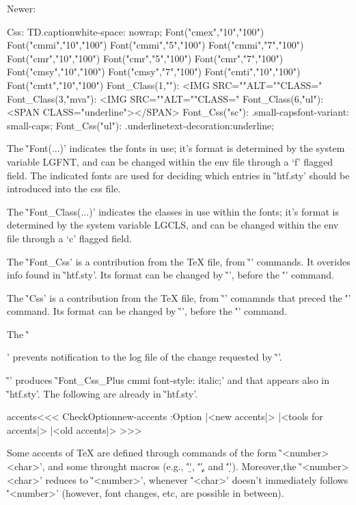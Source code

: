 {{{{{{{{Newer:

\Verbatim
Css: TD.caption{white-space: nowrap; }
Font("cmex","10","100")
Font("cmmi","10","100")
Font("cmmi","5","100")
Font("cmmi","7","100")
Font("cmr","10","100")
Font("cmr","5","100")
Font("cmr","7","100")
Font("cmsy","10","100")
Font("cmsy","7","100")
Font("cmti","10","100")
Font("cmtt","10","100")
Font_Class(1,""): <IMG SRC=""ALT=""CLASS="%
Font_Class(3,"mva"): <IMG SRC=""ALT=""CLASS="%
Font_Class(6,"ul"): <SPAN CLASS="underline"></SPAN>
Font_Css("sc"): .small-caps{font-variant: small-caps; }
Font_Css("ul"): .underline{text-decoration:underline; }
\EndVerbatim

The \`'Font(...)' indicates the fonts in use; it's format is determined
by the system variable LGFNT, and can be changed within the env file
through a `f' flagged field. The indicated fonts are used for deciding
which entries in \`'htf.sty' should be introduced into the css file.

The \`'Font_Class(...)' indicates the classes in use within the fonts;
it's format is determined by the system variable LGCLS, and can be
changed within the env file through a `c' flagged field.

The \`'Font_Css' is a contribution from the TeX file, from
\`''   commands.
It overides info found in \`'htf.sty'.
  Its format can be
changed by \`'', before the
\''\Preamble' command.

The \`'Css' is a contribution from the TeX file, from \`''
comamnds that preced the \''\CssFile' command.  Its format can be changed
by \`'', before the \''\Preamble' command.

The \`'' prevents notification to the
log file of the change requested by \`''.

\`''
produces
\`'Font_Css_Plus cmmi font-style: italic;'
and that appears also in \`'htf.sty'.
The following are already in \`'htf.sty'.



\<accents\><<<
\:CheckOption{new-accents}     \if:Option
   |<new accents|>
\else
   |<tools for accents|>
   |<old accents|> 
\fi
>>>





Some accents of TeX are defined through commands of the form
\`'\accent <number> <char>', and some throught macros (e.g., \''\b',
\''\c', and \''\d').  Moreover,the \`'\accent <number> <char>' reduces
to \`'\char <number>', whenever \''<char>' doesn't immediately follows
\''<number>' (however, font changes, etc, are possible in between).

}}}}}}}}
